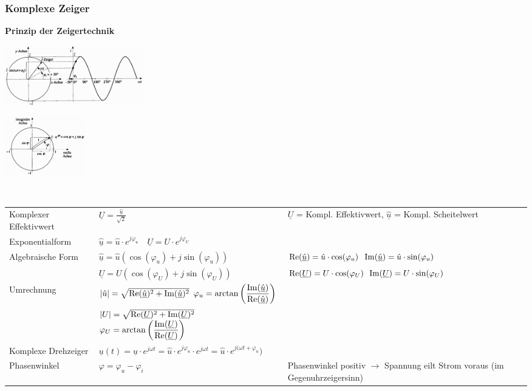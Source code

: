 		\subsubsection{Komplexe Zeiger}
			\begin{minipage}[t]{6cm}
            	\textbf{Prinzip der Zeigertechnik}
            \end{minipage}
			\begin{minipage}{6cm}
            	\includegraphics[width=6cm]{./bilder/RotierenderScheitelwertzeiger.png}
            \end{minipage}
			\begin{minipage}{3.5cm}
            	\includegraphics[width=3.5cm]{./bilder/EulerscheRelation.png}
            \end{minipage} \\
			\begin{tabular}{p{5cm}p{4.5cm}p{8.5cm}}
            	Komplexer Effektivwert &
            		$\underline{U} = \frac{\underline{\hat{u}}}{\sqrt{2}}$ &
            		$\underline{U}$ = Kompl. Effektivwert, $\underline{\hat{u}}$ = Kompl. Scheitelwert \\
				Exponentialform &
					$\underline{\hat{u}} = \hat{u} \cdot e^{j\varphi_u} \quad \underline{U} = U \cdot e^{j\varphi_U}$ \\
				Algebraische Form &
					$\underline{\hat{u}} = \hat{u} (\cos(\varphi_u)+j\sin(\varphi_u))$ &
					$\operatorname{Re}(\underline{\hat{u}}) = \hat{u} \cdot \cos(\varphi_u)$ \quad $\operatorname{Im}(\underline{\hat{u}}) = \hat{u} \cdot \sin(\varphi_u)$ \\
				&	$\underline{U} = U (\cos(\varphi_U)+j\sin(\varphi_U))$ &
					$\operatorname{Re}(\underline{U}) = U \cdot \cos(\varphi_U)$ \quad $\operatorname{Im}(\underline{U}) = U \cdot \sin(\varphi_U)$ \\
				Umrechnung &
					$|\hat{u}| = \sqrt{\operatorname{Re}(\underline{\hat{u}})^2 + \operatorname{Im}(\underline{\hat{u}})^2}$ \quad $\varphi_u = \arctan\left(\dfrac{\operatorname{Im}(\underline{\hat{u}})}{\operatorname{Re}(\underline{\hat{u}})}\right)$ \\
				&	$|U| = \sqrt{\operatorname{Re}(\underline{U})^2 + \operatorname{Im}(\underline{U})^2}$ \quad $\varphi_U = \arctan\left(\dfrac{\operatorname{Im}(\underline{U})}{\operatorname{Re}(\underline{U})}\right)$ \\
				Komplexe Drehzeiger &
					$\underline{u}(t) = \underline{\hat{u}} \cdot e^{j\omega t} = \hat{u} \cdot e^{j\varphi_u} \cdot e^{j\omega t} = \hat{u} \cdot e^{j(\omega t + \varphi_u})$ \\
				Phasenwinkel &
					$\varphi = \varphi_u - \varphi_i$ &
					Phasenwinkel positiv $\rightarrow$ Spannung eilt Strom voraus (im Gegenuhrzeigersinn) \\
			\end{tabular}
